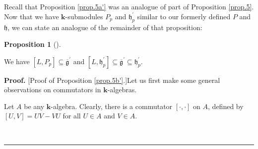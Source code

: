 \documentclass[numbers=enddot,12pt,final,onecolumn,notitlepage]{scrartcl}%
\theoremstyle{definition}
\newtheorem{prop}[theo]{Proposition}
\newenvironment{proposition}[1][]
{\begin{prop}[#1]\begin{leftbar}}
{\end{leftbar}\end{prop}}
\newenvironment{proof}[1][Proof]{\noindent\textbf{#1.} }{\ \rule{0.5em}{0.5em}}
\begin{document}
Recall that Proposition \ref{prop.5a'} was an analogue of part of Proposition
\ref{prop.5}. Now that we have $\mathbf{k}$-submodules $P_{p}$ and
$\mathfrak{h}_{p}^{\prime}$ similar to our formerly defined $P$ and
$\mathfrak{h}$, we can state an analogue of the remainder of that proposition:

\begin{proposition}
\label{prop.5b'}We have $\left[  L,P_{p}\right]  \subseteq\overline
{\mathfrak{g}}^{\prime}$ and $\left[  L,\mathfrak{h}_{p}^{\prime}\right]
\subseteq\overline{\mathfrak{g}}^{\prime}\subseteq\mathfrak{h}_{p}^{\prime}$.
\end{proposition}

\begin{proof}
[Proof of Proposition \ref{prop.5b'}.]Let us first make some general
observations on commutators in $\mathbf{k}$-algebras.

Let $A$ be any $\mathbf{k}$-algebra. Clearly, there is a commutator $\left[
\cdot,\cdot\right]  $ on $A$, defined by $\left[  U,V\right]  =UV-VU$ for all
$U\in A$ and $V\in A$.


\end{proof}
\end{document}
